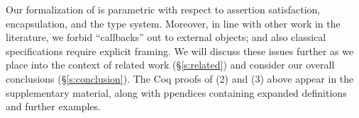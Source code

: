 Our formalization of \Nec %
{  is 
parametric} with respect to assertion
satisfaction, encapsulation, and the type system.
{{Moreover, in line} with other work in the literature,} we forbid 
``callbacks'' out to external objects; and also
classical specifications require explicit framing.
We will discuss these  issues %
further as we place \Nec into the context of 
related work (\S\ref{s:related}) and consider our overall conclusions
(\S\ref{s:conclusion}). 
%
The Coq proofs of 
(2) and (3) above appear in the
supplementary material, along with ppendices containing expanded 
definitions and further examples.

